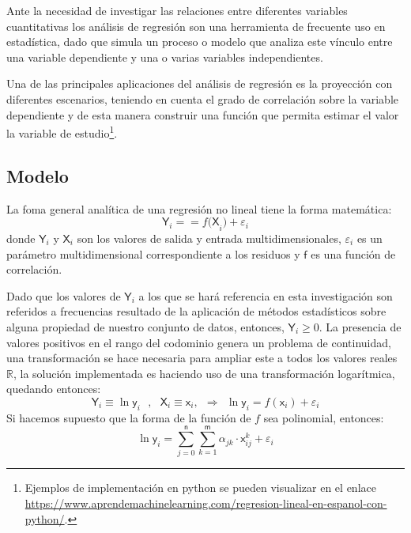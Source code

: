 Ante la necesidad de investigar las relaciones entre diferentes variables cuantitativas los análisis de regresión son una herramienta de frecuente uso en estadística, dado que simula un proceso o modelo que analiza este vínculo entre una variable dependiente y una o varias variables independientes. 

Una de las principales aplicaciones del análisis de regresión es la proyección con diferentes escenarios, teniendo en cuenta el grado de correlación sobre la variable dependiente y de esta manera construir una función que permita estimar el valor la variable de estudio\footnote{Ejemplos de implementación en python se pueden visualizar en el enlace \href{https://www.aprendemachinelearning.com/regresion-lineal-en-espanol-con-python/}{https://www.\-apren\-de\-machine\-learning\-.com/\-re\-gre\-si\-on-\-li\-neal-en-\-es\-pa\-nol-\-con-\-py\-thon/}.}. 

\subsection{Modelo}
La foma general analítica de una regresión no lineal tiene la forma matemática:
\begin{equation}
\textsf{Y}_i == f\textsf{(X}_i) + \varepsilon_i
\end{equation}
donde $\textsf{Y}_i$ y $\textsf{X}_i$ son los valores de salida y entrada multidimensionales, $\varepsilon_i$ es un parámetro multidimensional correspondiente a los residuos y $\textsf{f}$ es una función de correlación.

Dado que los valores de $\textsf{Y}_i$ a los que se hará referencia en esta investigación son referidos a frecuencias resultado de la aplicación de métodos estadísticos sobre alguna propiedad de nuestro conjunto de datos, entonces, $\textsf{Y}_i \geqslant 0$. La presencia de valores positivos en el rango del codominio genera un problema de continuidad, una transformación se hace necesaria para ampliar este a todos los valores reales $\mathbb{R}$, la solución implementada es haciendo uso de una transformación logarítmica, quedando entonces:
\begin{equation}
\textsf{Y}_i\equiv\ln\textsf{y}_i ~~~ , ~~~ \textsf{X}_i\equiv\textsf{x}_i, ~~ \Rightarrow~~ \ln \textsf{y}_i = f(\textsf{x}_i)+\varepsilon_i
\end{equation}
Si hacemos supuesto que la forma de la función de $f$ sea polinomial, %
 entonces:
\begin{equation}\label{regresion}
\ln \textsf{y}_{i} = \sum_{j=0}^\textsf{n}\sum_{k=1}^\textsf{m} \alpha_{jk} \cdot \textsf{x}_{ij}^k + \varepsilon_i
\end{equation}

